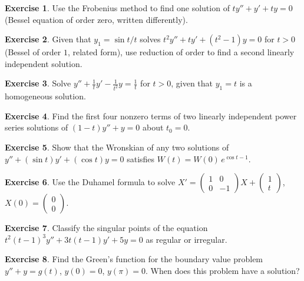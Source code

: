 \documentclass[12pt,a4paper,openany]{book}
\theoremstyle{definition}
\newtheorem{exercise}{Exercise}[chapter]
\theoremstyle{plain}
\theoremstyle{remark}
\begin{document}
\begin{exercise}\label{exo:meth-5}
Use the Frobenius method to find one solution of
$ty''+y'+ty=0$ (Bessel equation of order zero, written differently).
\end{exercise}

\begin{exercise}\label{exo:meth-6}
Given that $y_1=\sin t/t$ solves $t^2y''+ty'+(t^2-1)y=0$ for $t>0$
(Bessel of order $1$, related form), use reduction of order to find a
second linearly independent solution.
\end{exercise}

\begin{exercise}\label{exo:meth-7}
Solve $y''+\frac{1}{t}y'-\frac{1}{t^2}y=\frac{1}{t}$ for $t>0$,
given that $y_1=t$ is a homogeneous solution.
\end{exercise}

\begin{exercise}\label{exo:meth-8}
Find the first four nonzero terms of two linearly independent power
series solutions of $(1-t)y''+y=0$ about $t_0=0$.
\end{exercise}

\begin{exercise}\label{exo:meth-9}
Show that the Wronskian of any two solutions of
$y''+(\sin t)y'+(\cos t)y=0$ satisfies $W(t)=W(0)\,e^{\cos t-1}$.
\end{exercise}

\begin{exercise}\label{exo:meth-10}
Use the Duhamel formula to solve
$X'=\begin{pmatrix}1&0\\0&-1\end{pmatrix}X+\begin{pmatrix}1\\t\end{pmatrix}$,
$X(0)=\begin{pmatrix}0\\0\end{pmatrix}$.
\end{exercise}

\begin{exercise}\label{exo:meth-11}
Classify the singular points of the equation
$t^2(t-1)^3y''+3t(t-1)y'+5y=0$
as regular or irregular.
\end{exercise}

\begin{exercise}\label{exo:meth-12}
Find the Green's function for the boundary value problem
$y''+y=g(t)$, $y(0)=0$, $y(\pi)=0$.
When does this problem have a solution?
\end{exercise}
\end{document}
